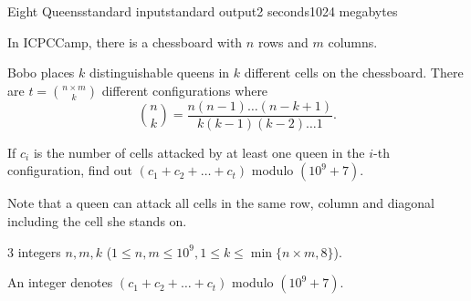\begin{problem}{Eight Queens}{standard input}{standard output}{2 seconds}{1024 megabytes}

In ICPCCamp, there is a chessboard with $n$ rows and $m$ columns.

Bobo places $k$ distinguishable queens in $k$ different cells on the chessboard. 
There are $t = \binom{n \times m}{k}$ different configurations
where $$\binom{n}{k} = \frac{n(n - 1)\dots (n - k + 1)}{k(k - 1)(k - 2)\dots 1}.$$

If $c_i$ is the number of cells attacked by at least one queen in the $i$-th configuration,
find out $(c_1 + c_2 + \dots + c_t)$ modulo $(10^9+7)$.

Note that a queen can attack all cells in the same row, column and diagonal including the cell she stands on. 

\InputFile
$3$ integers $n, m, k$ ($1 \leq n, m \leq 10^9, 1 \leq k \leq \min\{n \times m, 8\}$). 

\OutputFile
An integer denotes $(c_1 + c_2 + \dots + c_{t})$ modulo $(10^9+7)$.

\Examples

\begin{example}
%
%
\end{example}

\end{problem}

